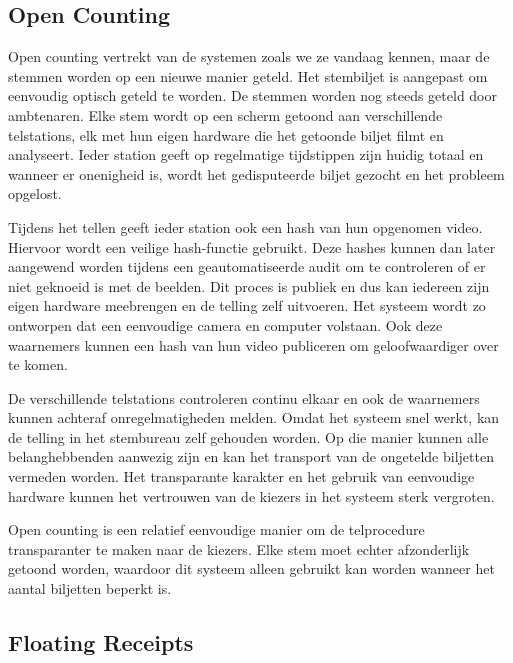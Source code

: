 \subsection[Open Counting]{Open Counting~\cite{adi_schuler_frohlich_open_counting}}
\label{sec:ls:open_counting}

Open counting vertrekt van de systemen zoals we ze vandaag kennen, maar de stemmen worden op een nieuwe manier geteld. Het stembiljet is aangepast om eenvoudig optisch geteld te worden. De stemmen worden nog steeds geteld door ambtenaren. Elke stem wordt op een scherm getoond aan verschillende telstations, elk met hun eigen hardware die het getoonde biljet filmt en analyseert. Ieder station geeft op regelmatige tijdstippen zijn huidig totaal en wanneer er onenigheid is, wordt het gedisputeerde biljet gezocht en het probleem opgelost.

\npar Tijdens het tellen geeft ieder station ook een hash van hun opgenomen video. Hiervoor wordt een veilige hash-functie gebruikt. Deze hashes kunnen dan later aangewend worden tijdens een geautomatiseerde audit om te controleren of er niet geknoeid is met de beelden. Dit proces is publiek en dus kan iedereen zijn eigen hardware meebrengen en de telling zelf uitvoeren. Het systeem wordt zo ontworpen dat een eenvoudige camera en computer volstaan. Ook deze waarnemers kunnen een hash van hun video publiceren om geloofwaardiger over te komen.

\npar De verschillende telstations controleren continu elkaar en ook de waarnemers kunnen achteraf onregelmatigheden melden. Omdat het systeem snel werkt, kan de telling in het stembureau zelf gehouden worden. Op die manier kunnen alle belanghebbenden aanwezig zijn en kan het transport van de ongetelde biljetten vermeden worden. Het transparante karakter en het gebruik van eenvoudige hardware kunnen het vertrouwen van de kiezers in het systeem sterk vergroten.

\npar Open counting is een relatief eenvoudige manier om de telprocedure transparanter te maken naar de kiezers. Elke stem moet echter afzonderlijk getoond worden, waardoor dit systeem alleen gebruikt kan worden wanneer het aantal biljetten beperkt is.

\subsection[Floating Receipts]{Floating Receipts~\cite{rivest_smith_three_voting_protocols}}
\label{sec:ls:floating_receipts}

